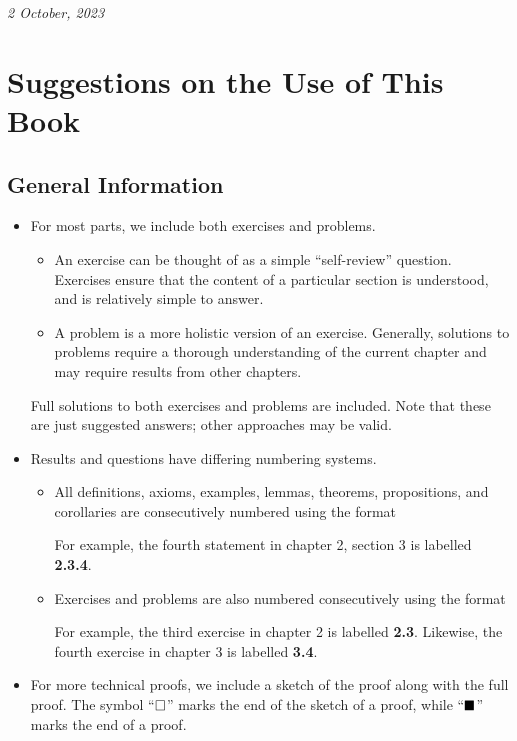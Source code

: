 \hfill{\textit{2 October, 2023}}

\chapter{Suggestions on the Use of This Book}
\section*{General Information}
\begin{itemize}
    \item For most parts, we include both exercises and problems.
    \begin{itemize}
        \item An exercise can be thought of as a simple ``self-review'' question. Exercises ensure that the content of a particular section is understood, and is relatively simple to answer.
        \item A problem is a more holistic version of an exercise. Generally, solutions to problems require a thorough understanding of the current chapter and may require results from other chapters.        
    \end{itemize}
    Full solutions to both exercises and problems are included. Note that these are just suggested answers; other approaches may be valid.

    \item Results and questions have differing numbering systems.
    \begin{itemize}
        \item All definitions, axioms, examples, lemmas, theorems, propositions, and corollaries are consecutively numbered using the format
        \begin{quote}
        \end{quote}
        For example, the fourth statement in chapter 2, section 3 is labelled \textbf{2.3.4}.
        \item Exercises and problems are also numbered consecutively using the format
        \begin{quote}
        \end{quote}
        For example, the third exercise in chapter 2 is labelled \textbf{2.3}. Likewise, the fourth exercise in chapter 3 is labelled \textbf{3.4}.
    \end{itemize}
    \item For more technical proofs, we include a sketch of the proof along with the full proof. The symbol ``$\square$'' marks the end of the sketch of a proof, while ``$\blacksquare$'' marks the end of a proof.
\end{itemize}

